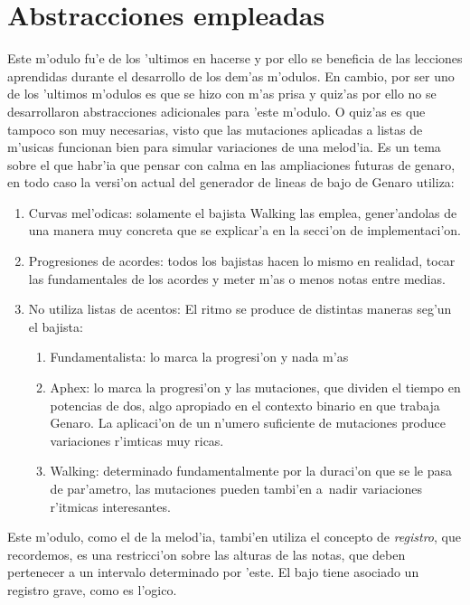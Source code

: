 \section{Abstracciones empleadas}
Este m'odulo fu'e de los 'ultimos en hacerse y por ello se beneficia de las lecciones aprendidas durante el desarrollo de los dem'as m'odulos. En cambio, por ser uno de los 'ultimos m'odulos es que se hizo con m'as prisa y quiz'as por ello no se desarrollaron abstracciones adicionales para 'este m'odulo. O quiz'as es que tampoco son muy necesarias, visto que las mutaciones aplicadas a listas de m'usicas funcionan bien para simular variaciones de una melod'ia. Es un tema sobre el que habr'ia que pensar con calma en las ampliaciones futuras de genaro, en todo caso la versi'on actual del generador de lineas de bajo de Genaro utiliza:
        \begin{enumerate}
        \item Curvas mel'odicas: solamente el bajista Walking las emplea, gener'andolas de una manera muy concreta que se explicar'a en la secci'on de implementaci'on.
        \item Progresiones de acordes: todos los bajistas hacen lo mismo en realidad, tocar las fundamentales de los acordes y meter m'as o menos notas entre medias.
        \item No utiliza listas de acentos: El ritmo se produce de distintas maneras seg'un el bajista:
                \begin{enumerate} 
                \item Fundamentalista: lo marca la progresi'on y nada m'as
                \item Aphex: lo marca la progresi'on y las mutaciones, que dividen el tiempo en potencias de dos, algo apropiado en el contexto binario en que trabaja Genaro. La aplicaci'on de un n'umero suficiente de mutaciones produce variaciones r'imticas muy ricas.
                \item Walking: determinado fundamentalmente por la duraci'on que se le pasa de par'ametro, las mutaciones pueden tambi'en a~nadir variaciones r'itmicas interesantes.
                \end{enumerate}
        \end{enumerate}

Este m'odulo, como el de la melod'ia, tambi'en utiliza el concepto de \emph{registro}, que recordemos, es una restricci'on sobre las alturas de las notas, que deben pertenecer a un intervalo determinado por 'este. El bajo tiene asociado un registro grave, como es l'ogico.


